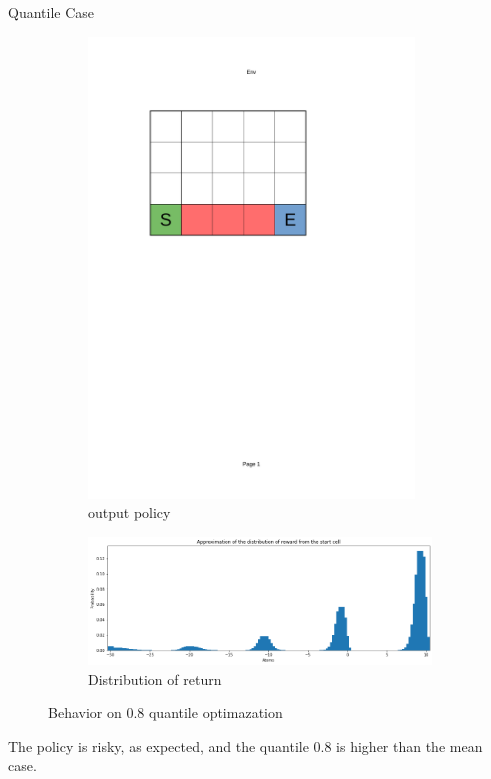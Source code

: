 \documentclass[10pt]{beamer}
\begin{document}
\begin{frame}{Quantile Case}
    \begin{figure}[!ht]
        \centering
        \begin{subfigure}{0.25\textwidth}
            \centering
                \includegraphics[page=7, trim = 40mm 160mm 70mm 45mm, clip, width=0.95\textwidth]{figures/personal_work/policies.pdf}
            \caption{output policy}
        \end{subfigure}
        \hfill
        \begin{subfigure}{0.70\textwidth}
            \centering
                \includegraphics[width=\textwidth]{figures/personal_work/distrib_q80.png}
            \caption{Distribution of return}
        \end{subfigure}
            \caption{Behavior on 0.8 quantile optimazation}
    \end{figure}

    The policy is risky, as expected, and the quantile 0.8 is higher than the mean case.

\end{frame}
\end{document}
